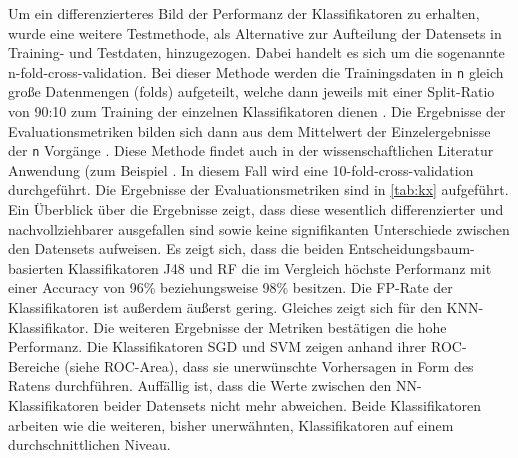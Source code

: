 Um ein differenzierteres Bild der Performanz der Klassifikatoren zu erhalten, wurde eine weitere Testmethode, als Alternative zur Aufteilung der Datensets in Training- und Testdaten, hinzugezogen. Dabei handelt es sich um die sogenannte \glqq n-fold-cross-validation\grqq. Bei dieser Methode werden die Trainingsdaten in \texttt{n} gleich große Datenmengen (\glqq folds\grqq) aufgeteilt, welche dann jeweils mit einer Split-Ratio von 90:10 zum Training der einzelnen Klassifikatoren dienen \cite{IanWitten}. Die Ergebnisse der Evaluationsmetriken bilden sich dann aus dem Mittelwert der Einzelergebnisse der \texttt{n} Vorgänge \cite{IanWitten}. Diese Methode findet auch in der wissenschaftlichen Literatur Anwendung (zum Beispiel \cite{Alam2013,Chawla2002,Alsaeedi2019}. In diesem Fall wird eine 10-fold-cross-validation durchgeführt. Die Ergebnisse der Evaluationsmetriken sind in \autoref{tab:kx} aufgeführt. Ein Überblick über die Ergebnisse zeigt, dass diese wesentlich differenzierter und nachvollziehbarer ausgefallen sind sowie keine signifikanten Unterschiede zwischen den Datensets aufweisen. Es zeigt sich, dass die beiden Entscheidungsbaum-basierten Klassifikatoren J48 und RF die im Vergleich höchste Performanz mit einer Accuracy von 96\% beziehungsweise 98\% besitzen. Die FP-Rate der Klassifikatoren ist außerdem äußerst gering. Gleiches zeigt sich für den KNN-Klassifikator. Die weiteren Ergebnisse der Metriken bestätigen die hohe Performanz. Die Klassifikatoren SGD und SVM zeigen anhand ihrer ROC-Bereiche (siehe ROC-Area), dass sie unerwünschte Vorhersagen in Form des \glqq Ratens\grqq{} durchführen. Auffällig ist, dass die Werte zwischen den NN-Klassifikatoren beider Datensets nicht mehr abweichen. Beide Klassifikatoren arbeiten wie die weiteren, bisher unerwähnten, Klassifikatoren auf einem durchschnittlichen Niveau.

